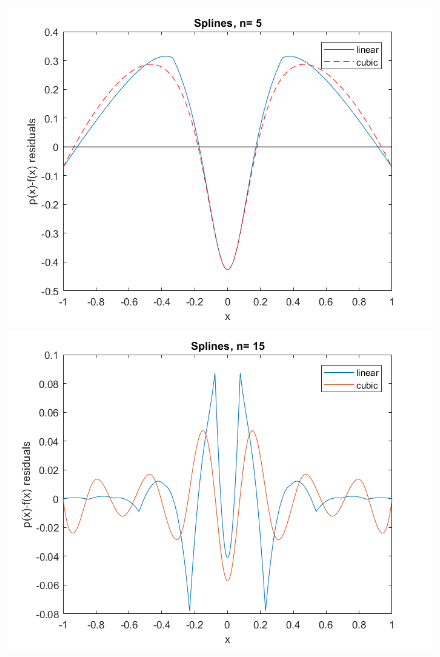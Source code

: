 \documentclass{article}
\begin{document}
	\begin{figure}[h]
	\begin{minipage}{0.56\textwidth}
	  \includegraphics[width = \textwidth, keepaspectratio]{n5lincub.png}
    \end{minipage}
    \begin{minipage}{0.56\textwidth}
	  \includegraphics[width = \textwidth, keepaspectratio]{n15lincub.png}
    \end{minipage}
    \begin{minipage}{0.56\textwidth}

\end{minipage}
\end{figure}
\end{document}
